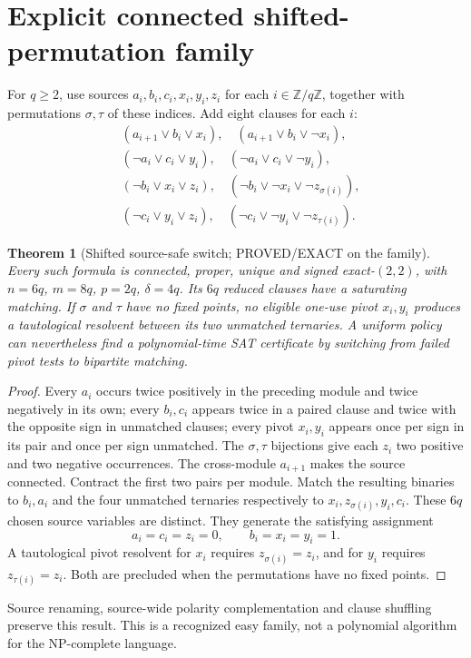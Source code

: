 \documentclass[11pt]{article}
\newtheorem{theorem}{Theorem}
\begin{document}
\section{Explicit connected shifted-permutation family}
For $q\ge2$, use sources $a_i,b_i,c_i,x_i,y_i,z_i$ for each $i\in\mathbb Z/q\mathbb Z$, together with permutations $\sigma,\tau$ of these indices. Add eight clauses for each $i$:
\begin{align*}
 &(a_{i+1}\vee b_i\vee x_i),\quad
 (a_{i+1}\vee b_i\vee\neg x_i),\\
 &(\neg a_i\vee c_i\vee y_i),\quad
 (\neg a_i\vee c_i\vee\neg y_i),\\
 &(\neg b_i\vee x_i\vee z_i),\quad
 (\neg b_i\vee\neg x_i\vee\neg z_{\sigma(i)}),\\
 &(\neg c_i\vee y_i\vee z_i),\quad
 (\neg c_i\vee\neg y_i\vee\neg z_{\tau(i)}).
\end{align*}
\begin{theorem}[Shifted source-safe switch; PROVED/EXACT on the family]
Every such formula is connected, proper, unique and signed exact-$(2,2)$, with $n=6q$, $m=8q$, $p=2q$, $\delta=4q$. Its $6q$ reduced clauses have a saturating matching. If $\sigma$ and $\tau$ have no fixed points, no eligible one-use pivot $x_i,y_i$ produces a tautological resolvent between its two unmatched ternaries. A uniform policy can nevertheless find a polynomial-time SAT certificate by switching from failed pivot tests to bipartite matching.
\end{theorem}
\begin{proof}
Every $a_i$ occurs twice positively in the preceding module and twice negatively in its own; every $b_i,c_i$ appears twice in a paired clause and twice with the opposite sign in unmatched clauses; every pivot $x_i,y_i$ appears once per sign in its pair and once per sign unmatched. The $\sigma,\tau$ bijections give each $z_i$ two positive and two negative occurrences. The cross-module $a_{i+1}$ makes the source connected. Contract the first two pairs per module. Match the resulting binaries to $b_i,a_i$ and the four unmatched ternaries respectively to $x_i,z_{\sigma(i)},y_i,c_i$. These $6q$ chosen source variables are distinct. They generate the satisfying assignment
\[
a_i=c_i=z_i=0,\qquad b_i=x_i=y_i=1.
\]
A tautological pivot resolvent for $x_i$ requires $z_{\sigma(i)}=z_i$, and for $y_i$ requires $z_{\tau(i)}=z_i$. Both are precluded when the permutations have no fixed points.
\end{proof}
Source renaming, source-wide polarity complementation and clause shuffling preserve this result. This is a recognized easy family, not a polynomial algorithm for the NP-complete language.
\end{document}

